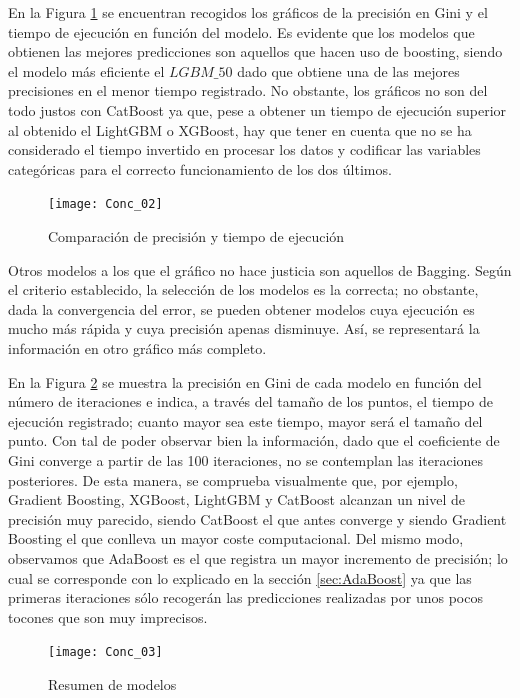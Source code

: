 \documentclass[12pt,twoside]{article}
\begin{document}
En la Figura \ref{fig:Model_comparison_01} se encuentran recogidos los gráficos de la precisión en Gini y el tiempo de ejecución en función del modelo. Es evidente que los modelos que obtienen las mejores predicciones son aquellos que hacen uso de boosting, siendo el modelo más eficiente el $LGBM\_50$ dado que obtiene una de las mejores precisiones en el menor tiempo registrado. No obstante, los gráficos no son del todo justos con CatBoost ya que, pese a obtener un tiempo de ejecución superior al obtenido el LightGBM o XGBoost, hay que tener en cuenta que no se ha considerado el tiempo invertido en procesar los datos y codificar las variables categóricas para el correcto funcionamiento de los dos últimos.

\begin{figure}[H]
\centering
\texttt{[image: Conc\_02]}
\caption{Comparación de precisión y tiempo de ejecución}
\label{fig:Model_comparison_01}
\end{figure}

Otros modelos a los que el gráfico no hace justicia son aquellos de Bagging. Según el criterio establecido, la selección de los modelos es la correcta; no obstante, dada la convergencia del error, se pueden obtener modelos cuya ejecución es mucho más rápida y cuya precisión apenas disminuye. Así, se representará la información en otro gráfico más completo.

En la Figura \ref{fig:Model_comparison_02} se muestra la precisión en Gini de cada modelo en función del número de iteraciones e indica, a través del tamaño de los puntos, el tiempo de ejecución registrado; cuanto mayor sea este tiempo, mayor será el tamaño del punto. Con tal de poder observar bien la información, dado que el coeficiente de Gini converge a partir de las 100 iteraciones, no se contemplan las iteraciones posteriores. De esta manera, se comprueba visualmente que, por ejemplo, Gradient Boosting, XGBoost, LightGBM y CatBoost alcanzan un nivel de precisión muy parecido, siendo CatBoost el que antes converge y siendo Gradient Boosting el que conlleva un mayor coste computacional. Del mismo modo, observamos que AdaBoost es el que registra un mayor incremento de precisión; lo cual se corresponde con lo explicado en la sección \ref{sec:AdaBoost} ya que las primeras iteraciones sólo recogerán las predicciones realizadas por unos pocos tocones que son muy imprecisos.
\begin{figure}[h]
\centering
\texttt{[image: Conc\_03]}
\caption{Resumen de modelos}
\label{fig:Model_comparison_02}
\end{figure}
\end{document}
